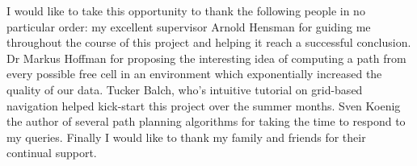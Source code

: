 \def\baselinestretch{1.0}

\noindent 
I would like to take this opportunity to thank the following people in no particular order: my excellent supervisor Arnold Hensman for guiding me throughout the course of this project and helping it reach a successful conclusion. Dr Markus Hoffman for proposing the interesting idea of computing a path from every possible free cell in an environment which exponentially increased the quality of our data. Tucker Balch, who's intuitive tutorial on grid-based navigation helped kick-start this project over the summer months. Sven Koenig the author of several path planning algorithms for taking the time to respond to my queries. Finally I would like to thank my family and friends for their continual support.

